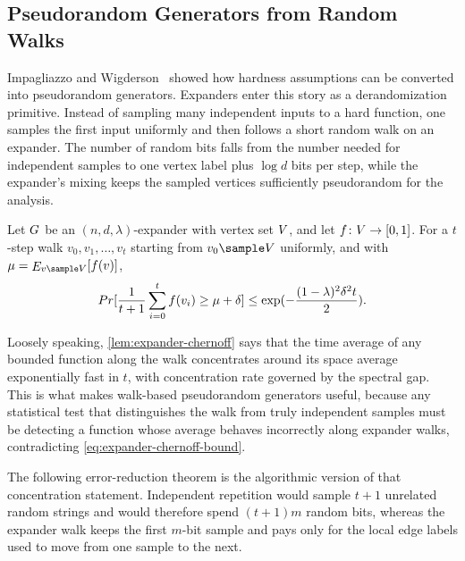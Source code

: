 \subsection{Pseudorandom Generators from Random Walks}
\label{subsec:prg-from-walks}

Impagliazzo and Wigderson~\cite{IW1997} showed how hardness assumptions can be converted into pseudorandom generators. Expanders enter this story as a derandomization primitive. Instead of sampling many independent inputs to a hard function, one samples the first input uniformly and then follows a short random walk on an expander. The number of random bits falls from the number needed for independent samples to one vertex label plus \(\log d\) bits per step, while the expander's mixing keeps the sampled vertices sufficiently pseudorandom for the analysis.

\begin{lemma}
	\label{lem:expander-chernoff}
	Let \(G\) be an \((n,d,\lambda)\)-expander with vertex set \(V\), and let \(f\colon V\to[0,1]\). For a \(t\)-step walk \(v_0,v_1,\ldots,v_t\) starting from \(v_0\sample\Vertices\) uniformly, and with \(\mu=\EE_{v\sample\Vertices}[f(v)]\),
	\begin{equation}
		\label{eq:expander-chernoff-bound}
		\Prob\left[\frac{1}{t+1}\sum_{i=0}^t f(v_i) \geq \mu + \delta\right]\leq \exp\left(-\frac{(1-\lambda)^2\delta^2t}{2}\right).
	\end{equation}
\end{lemma}

Loosely speaking, \cref{lem:expander-chernoff} says that the time average of any bounded function along the walk concentrates around its space average exponentially fast in \(t\), with concentration rate governed by the spectral gap. This is what makes walk-based pseudorandom generators useful, because any statistical test that distinguishes the walk from truly independent samples must be detecting a function whose average behaves incorrectly along expander walks, contradicting \cref{eq:expander-chernoff-bound}.

The following error-reduction theorem is the algorithmic version of that concentration statement. Independent repetition would sample \(t+1\) unrelated random strings and would therefore spend \((t+1)m\) random bits, whereas the expander walk keeps the first \(m\)-bit sample and pays only for the local edge labels used to move from one sample to the next.

